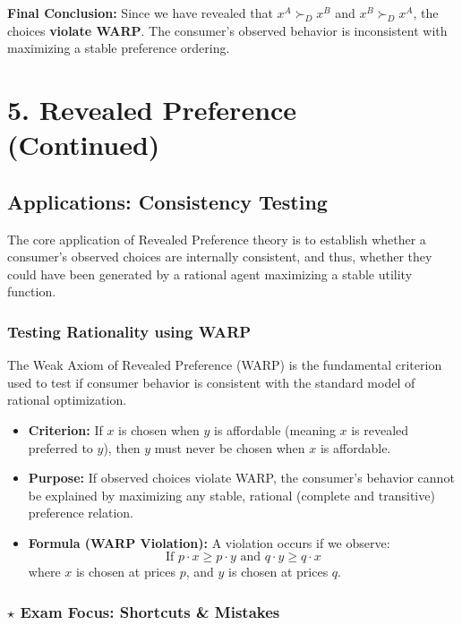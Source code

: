 \documentclass{article}
\begin{document}
\textbf{Final Conclusion:} Since we have revealed that $x^A \succ_D x^B$ and $x^B \succ_D x^A$, the choices \textbf{violate WARP}. The consumer's observed behavior is inconsistent with maximizing a stable preference ordering.

\section*{5. Revealed Preference (Continued)}

\subsection*{Applications: Consistency Testing}

The core application of Revealed Preference theory is to establish whether a consumer's observed choices are internally consistent, and thus, whether they could have been generated by a rational agent maximizing a stable utility function.

\subsubsection*{Testing Rationality using WARP}

The Weak Axiom of Revealed Preference (WARP) is the fundamental criterion used to test if consumer behavior is consistent with the standard model of rational optimization.

\begin{itemize}
    \item \textbf{Criterion:} If $x$ is chosen when $y$ is affordable (meaning $x$ is revealed preferred to $y$), then $y$ must never be chosen when $x$ is affordable.
    \item \textbf{Purpose:} If observed choices violate WARP, the consumer's behavior cannot be explained by maximizing any stable, rational (complete and transitive) preference relation.
    \item \textbf{Formula (WARP Violation):} A violation occurs if we observe:
    \[\text{If } p \cdot x \geq p \cdot y \text{ and } q \cdot y \geq q \cdot x\]
    where $x$ is chosen at prices $p$, and $y$ is chosen at prices $q$.
\end{itemize}

\subsubsection*{$\star$ Exam Focus: Shortcuts \& Mistakes}
\end{document}
